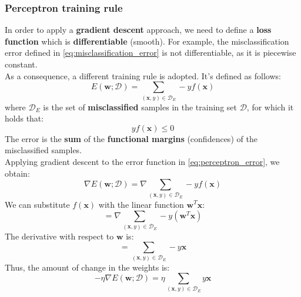 \subsubsection*{Perceptron training rule}
In order to apply a \textbf{gradient descent} approach, we need to define a \textbf{loss function} which is \textbf{differentiable} (smooth).
For example, the misclassification error defined in \eqref{eq:misclassification_error} 
is not differentiable, as it is piecewise constant.
\\As a consequence, a different training rule is adopted. It's defined as follows:
\begin{equation}\label{eq:perceptron_error}
    E(\boldsymbol{w}; \mathcal{D}) = \sum_{(\boldsymbol{x}, y) \in \mathcal{D}_E} -yf(\boldsymbol{x})
\end{equation}
where $\mathcal{D}_E$ is the set of \textbf{misclassified} samples in the training set $\mathcal{D}$, 
for which it holds that:
\[ yf(\boldsymbol{x}) \leq 0 \]
The error is the \textbf{sum} of the \textbf{functional margins} (confidences) of the misclassified samples.
\\Applying gradient descent to the error function in \eqref{eq:perceptron_error}, we obtain:
\[\nabla E(\boldsymbol{w}; \mathcal{D}) = \nabla \sum_{(\boldsymbol{x}, y) \in \mathcal{D}_E} -yf(\boldsymbol{x})\]
We can substitute $f(\boldsymbol{x})$ with the linear function $\boldsymbol{w}^T \boldsymbol{x}$:
\[=\nabla \sum_{(\boldsymbol{x}, y) \in \mathcal{D}_E} -y(\boldsymbol{w}^T \boldsymbol{x}) \]
The derivative with respect to $\boldsymbol{w}$ is:
\[= \sum_{(\boldsymbol{x}, y) \in \mathcal{D}_E} -y \boldsymbol{x} \]
Thus, the amount of change in the weights is:
\[- \eta \nabla E(\boldsymbol{w}; \mathcal{D}) = \eta \sum_{(\boldsymbol{x}, y) \in \mathcal{D}_E} y \boldsymbol{x} \]
